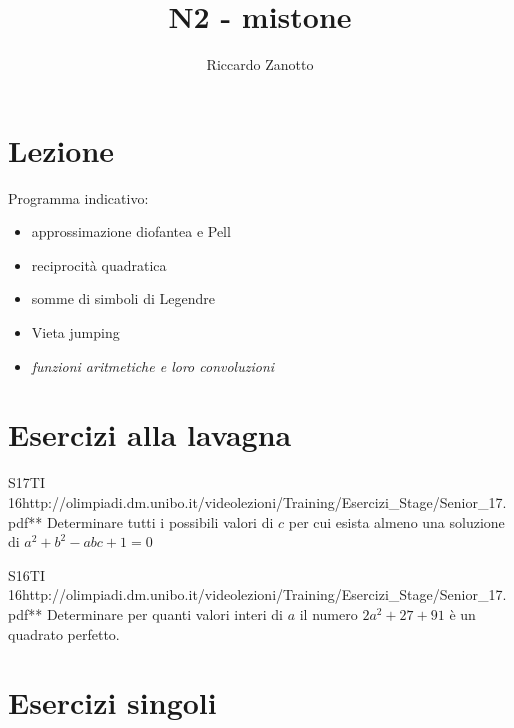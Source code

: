 \documentclass[12pt]{article}
\author{Riccardo Zanotto}
\title{N2 - mistone}
\begin{document}
\maketitle


\section{Lezione}

Programma indicativo:

\begin{itemize}
    \item approssimazione diofantea e Pell
    \item reciprocità quadratica
    \item somme di simboli di Legendre
    \item Vieta jumping
    \item \textit{funzioni aritmetiche e loro convoluzioni}
\end{itemize}

\section{Esercizi alla lavagna}

\begin{esercizio}{S17TI 16}{http://olimpiadi.dm.unibo.it/videolezioni/Training/Esercizi_Stage/Senior_17.pdf}{**}
    Determinare tutti i possibili valori di $c$ per cui esista almeno una soluzione di $a^2+b^2-abc+1=0$
\end{esercizio}

\begin{esercizio}{S16TI 16}{http://olimpiadi.dm.unibo.it/videolezioni/Training/Esercizi_Stage/Senior_17.pdf}{**}
    Determinare per quanti valori interi di $a$ il numero $2a^2+27+91$ è un quadrato perfetto.
\end{esercizio}

\section{Esercizi singoli}
\end{document}
